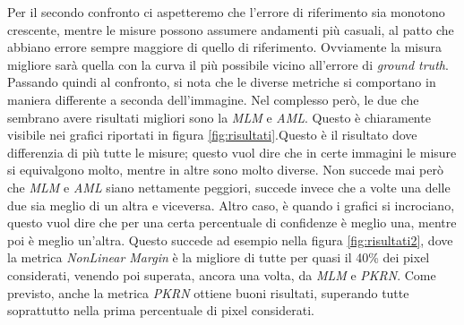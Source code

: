 \documentclass[12pt]{report}
\begin{document}
			\noindent Per il secondo confronto ci aspetteremo che l'errore di riferimento sia monotono crescente, mentre le misure possono assumere andamenti più casuali, al patto che abbiano errore sempre maggiore di quello di riferimento. Ovviamente la misura migliore sarà quella con la curva il più possibile vicino all'errore di \textit{ground truth}. Passando quindi al confronto, si nota che le diverse metriche si comportano in maniera differente a seconda dell'immagine. Nel complesso però, le due che sembrano avere risultati migliori sono la \textit{MLM} e \textit{AML}. Questo è chiaramente visibile nei grafici riportati in figura \ref{fig:risultati}.Questo è il risultato dove differenzia di più tutte le misure; questo vuol dire che in certe immagini le misure si equivalgono molto, mentre in altre sono molto diverse. Non succede mai però che \textit{MLM} e \textit{AML} siano nettamente peggiori, succede invece che a volte una delle due sia meglio di un altra e viceversa. Altro caso, è quando i grafici si incrociano, questo vuol dire che per una certa percentuale di confidenze è meglio una, mentre poi è meglio un'altra. Questo succede ad esempio nella figura \ref{fig:risultati2}, dove la metrica \textit{NonLinear Margin} è la migliore di tutte per quasi il 40\% dei pixel considerati, venendo poi superata, ancora una volta, da \textit{MLM} e \textit{PKRN}. Come previsto, anche la metrica \textit{PKRN} ottiene buoni risultati, superando tutte soprattutto nella prima percentuale di pixel considerati. 		
			
\end{document}
